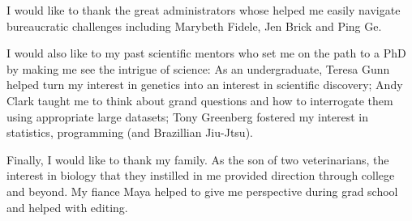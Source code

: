 I would like to thank the great administrators whose helped me easily navigate bureaucratic challenges including Marybeth Fidele, Jen Brick and Ping Ge. 

I would also like to my past scientific mentors who set me on the path to a PhD by making me see the intrigue of science: As an undergraduate, Teresa Gunn helped turn my interest in genetics into an interest in scientific discovery; Andy Clark taught me to think about grand questions and how to interrogate them using appropriate large datasets; Tony Greenberg fostered my interest in statistics, programming (and Brazillian Jiu-Jtsu).

Finally, I would like to thank my family. As the son of two veterinarians, the interest in biology that they instilled in me provided direction through college and beyond. My fiance Maya helped to give me perspective during grad school and helped with editing.